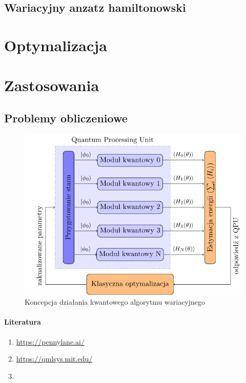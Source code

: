 \documentclass[a4paper,11pt
]{article}
\begin{document}
\subsection{Wariacyjny anzatz hamiltonowski}

\hypertarget{optymalizacja}{%
	\section{Optymalizacja}\label{optymalizacja}}

\hypertarget{zastosowania}{%
	\section{Zastosowania}\label{zastosowania}}


\hypertarget{matematyczne}{%
	\subsection{Problemy obliczeniowe}\label{matematyczne}}


\begin{figure}
\centering
\includegraphics{vqe-pl.pdf}
\caption{Koncepcja działania kwantowego algorytmu wariacyjnego}
\end{figure}



\hypertarget{literatura}{%
\paragraph{Literatura}\label{literatura}}

\begin{enumerate}
\def\labelenumi{\arabic{enumi}.}

\item \url{https://pennylane.ai/}

\item \url{https://qmlsys.mit.edu/}

\item 
\end{enumerate}
\end{document}
